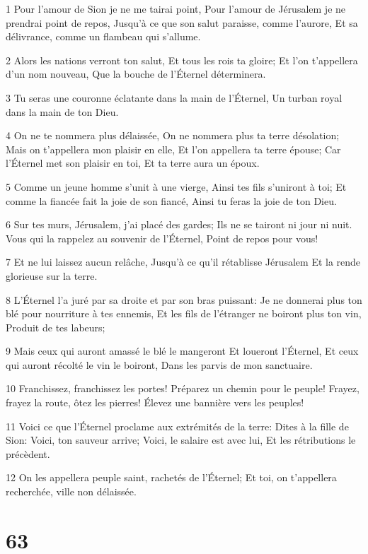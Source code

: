 \par 1 Pour l'amour de Sion je ne me tairai point, Pour l'amour de Jérusalem je ne prendrai point de repos, Jusqu'à ce que son salut paraisse, comme l'aurore, Et sa délivrance, comme un flambeau qui s'allume.
\par 2 Alors les nations verront ton salut, Et tous les rois ta gloire; Et l'on t'appellera d'un nom nouveau, Que la bouche de l'Éternel déterminera.
\par 3 Tu seras une couronne éclatante dans la main de l'Éternel, Un turban royal dans la main de ton Dieu.
\par 4 On ne te nommera plus délaissée, On ne nommera plus ta terre désolation; Mais on t'appellera mon plaisir en elle, Et l'on appellera ta terre épouse; Car l'Éternel met son plaisir en toi, Et ta terre aura un époux.
\par 5 Comme un jeune homme s'unit à une vierge, Ainsi tes fils s'uniront à toi; Et comme la fiancée fait la joie de son fiancé, Ainsi tu feras la joie de ton Dieu.
\par 6 Sur tes murs, Jérusalem, j'ai placé des gardes; Ils ne se tairont ni jour ni nuit. Vous qui la rappelez au souvenir de l'Éternel, Point de repos pour vous!
\par 7 Et ne lui laissez aucun relâche, Jusqu'à ce qu'il rétablisse Jérusalem Et la rende glorieuse sur la terre.
\par 8 L'Éternel l'a juré par sa droite et par son bras puissant: Je ne donnerai plus ton blé pour nourriture à tes ennemis, Et les fils de l'étranger ne boiront plus ton vin, Produit de tes labeurs;
\par 9 Mais ceux qui auront amassé le blé le mangeront Et loueront l'Éternel, Et ceux qui auront récolté le vin le boiront, Dans les parvis de mon sanctuaire.
\par 10 Franchissez, franchissez les portes! Préparez un chemin pour le peuple! Frayez, frayez la route, ôtez les pierres! Élevez une bannière vers les peuples!
\par 11 Voici ce que l'Éternel proclame aux extrémités de la terre: Dites à la fille de Sion: Voici, ton sauveur arrive; Voici, le salaire est avec lui, Et les rétributions le précèdent.
\par 12 On les appellera peuple saint, rachetés de l'Éternel; Et toi, on t'appellera recherchée, ville non délaissée.

\chapter{63}

